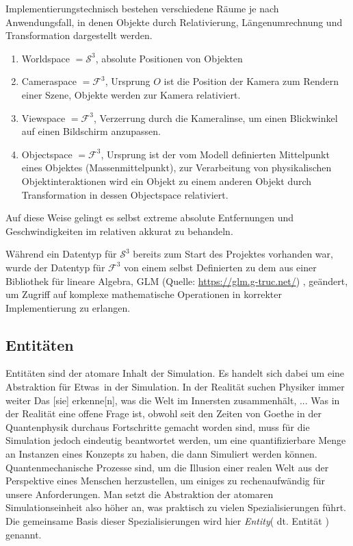 Implementierungstechnisch bestehen verschiedene Räume je nach Anwendungsfall, in denen Objekte durch Relativierung, Längenumrechnung und Transformation dargestellt werden.

\begin{enumerate}
\item Worldspace $= \mathcal{S}^3$, absolute Positionen von Objekten
\item Cameraspace $= \mathcal{F}^3$, Ursprung $O$ ist die Position der Kamera zum Rendern einer Szene, Objekte werden zur Kamera relativiert.
\item Viewspace $= \mathcal{F}^3$, Verzerrung durch die Kameralinse, um einen Blickwinkel auf einen Bildschirm anzupassen.
\item Objectspace $= \mathcal{F}^3$, Ursprung ist der vom Modell definierten Mittelpunkt eines Objektes (Massenmittelpunkt), zur Verarbeitung von physikalischen Objektinteraktionen wird ein Objekt zu einem anderen Objekt durch Transformation in dessen Objectspace relativiert.
\end{enumerate}

Auf diese Weise gelingt es selbst extreme absolute Entfernungen und Geschwindigkeiten im relativen akkurat zu behandeln.

Während ein Datentyp für $\mathcal{S}^3$ bereits zum Start des Projektes vorhanden war, wurde der Datentyp für $\mathcal{F}^3$ von einem selbst Definierten zu dem aus einer Bibliothek für lineare Algebra, GLM (Quelle: \url{https://glm.g-truc.net/})
, geändert, um Zugriff auf komplexe mathematische Operationen in korrekter Implementierung zu erlangen.

\subsection{Entitäten}
\label{sec:entity}
Entitäten sind der atomare Inhalt der Simulation. Es handelt sich dabei um eine Abstraktion für \glqq Etwas\grqq ~in der Simulation. In der Realität suchen Physiker immer weiter \glqq Das [sie] erkenne[n], was die Welt im Innersten zusammenhält, ... Was in der Realität eine offene Frage ist, obwohl seit den Zeiten von Goethe in der Quantenphysik durchaus Fortschritte gemacht worden sind, muss für die Simulation jedoch eindeutig beantwortet werden, um eine quantifizierbare Menge an Instanzen eines Konzepts zu haben, die dann Simuliert werden können.\\
Quantenmechanische Prozesse sind, um die Illusion einer realen Welt aus der Perspektive eines Menschen herzustellen, um einiges zu rechenaufwändig für unsere Anforderungen. Man setzt die Abstraktion der atomaren Simulationseinheit also höher an, was praktisch zu vielen Spezialisierungen führt. Die gemeinsame Basis dieser Spezialisierungen wird hier \textit{Entity}( dt. Entität ) genannt.\\

